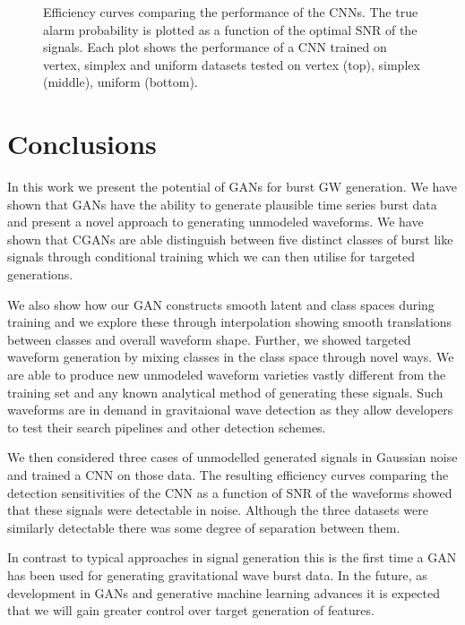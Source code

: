 \documentclass[12pt]{iopart}
\begin{document}
\begin{figure}[h!]
\caption{Efficiency curves comparing the performance of the \acp{CNN}. The true alarm probability is plotted as a function of the optimal SNR of the signals. Each plot shows the performance of a CNN trained on vertex, simplex and uniform datasets tested on vertex (top), simplex (middle), uniform (bottom).}
\label{fig:eff_curves}
\end{figure}

\section{Conclusions}\label{conclusions}

%

In this work we present the potential of \acp{GAN} for
burst \ac{GW} generation. We have shown that \acp{GAN} have the ability to generate plausible time series burst data and present a novel approach to generating unmodeled waveforms. We have shown that CGANs are able distinguish between five distinct classes of burst like signals through conditional training which we can then utilise for targeted generations. 

We also show how our GAN constructs smooth latent and class spaces during training and we explore these through interpolation showing smooth translations between classes and overall
waveform shape. Further, we showed targeted waveform generation by mixing classes in the class space through novel ways. We are able to produce new unmodeled waveform varieties vastly different from the training set and any known analytical method of generating these signals. Such waveforms are in demand in gravitaional wave detection as they allow developers to test their search pipelines and other detection schemes.

We then considered three cases of unmodelled generated signals in Gaussian noise and trained a \ac{CNN} on those data. The resulting efficiency curves comparing the detection sensitivities of the CNN as a function of SNR of the waveforms showed that these signals were detectable in noise. Although the three datasets were similarly detectable there was some degree of separation between them.

In contrast to typical approaches in signal generation this is the first time a GAN has been used for generating gravitational wave burst data. In the future, as development in GANs and generative machine learning advances it is expected that we will gain greater control over target generation of features. 
\end{document}
